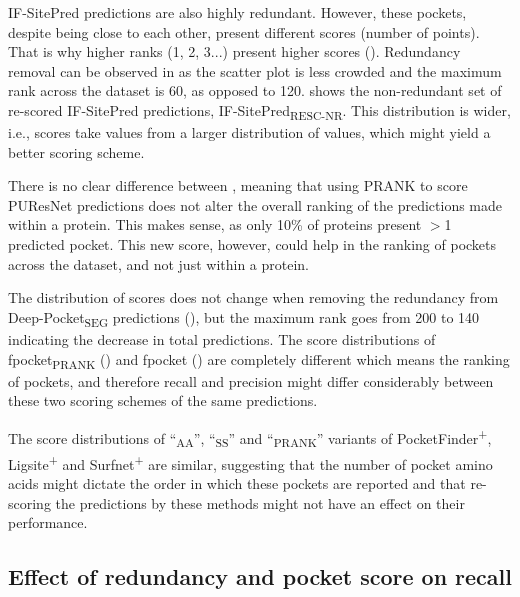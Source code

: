 IF-SitePred predictions are also highly redundant. However, these pockets, despite being close to each other, present different scores (number of points). That is why higher ranks (1, 2, 3...) present higher scores (). Redundancy removal can be observed in  as the scatter plot is less crowded and the maximum rank across the dataset is 60, as opposed to 120.  shows the non-redundant set of re-scored IF-SitePred predictions, IF-SitePred\textsubscript{RESC-NR}. This distribution is wider, i.e., scores take values from a larger distribution of values, which might yield a better scoring scheme.

There is no clear difference between , meaning that using PRANK to score PUResNet predictions does not alter the overall ranking of the predictions made within a protein. This makes sense, as only 10\% of proteins present $>$1 predicted pocket. This new score, however, could help in the ranking of pockets across the dataset, and not just within a protein.

The distribution of scores does not change when removing the redundancy from Deep-Pocket\textsubscript{SEG} predictions (), but the maximum rank goes from 200 to 140 indicating the decrease in total predictions. The score distributions of fpocket\textsubscript{PRANK} () and fpocket () are completely different which means the ranking of pockets, and therefore recall and precision might differ considerably between these two scoring schemes of the same predictions.

The score distributions of ``\textsubscript{AA}'', ``\textsubscript{SS}'' and ``\textsubscript{PRANK}'' variants of PocketFinder\textsuperscript{+}, Ligsite\textsuperscript{+} and Surfnet\textsuperscript{+} are similar, suggesting that the number of pocket amino acids might dictate the order in which these pockets are reported  and that re-scoring the predictions by these methods might not have an effect on their performance.

\subsection{Effect of redundancy and pocket score on recall}

